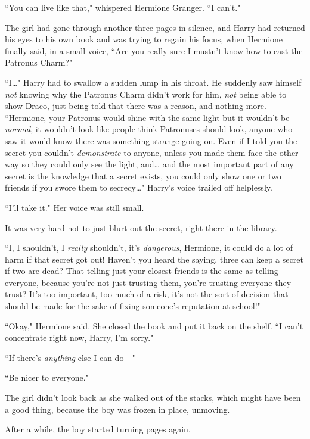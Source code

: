 ``You can live like that," whispered Hermione Granger. ``I can't."

The girl had gone through another three pages in silence, and Harry had returned his eyes to his own book and was trying to regain his focus, when Hermione finally said, in a small voice, ``Are you really sure I mustn't know how to cast the Patronus Charm?"

``I{\ldots}" Harry had to swallow a sudden lump in his throat. He suddenly saw himself \emph{not} knowing why the Patronus Charm didn't work for him, \emph{not} being able to show Draco, just being told that there was a reason, and nothing more. ``Hermione, your Patronus would shine with the same light but it wouldn't be \emph{normal}, it wouldn't look like people think Patronuses should look, anyone who saw it would know there was something strange going on. Even if I told you the secret you couldn't \emph{demonstrate} to anyone, unless you made them face the other way so they could only see the light, and{\ldots} and the most important part of any secret is the knowledge that a secret exists, you could only show one or two friends if you swore them to secrecy{\ldots}" Harry's voice trailed off helplessly.

``I'll take it." Her voice was still small.

It was very hard not to just blurt out the secret, right there in the library.

``I, I shouldn't, I \emph{really} shouldn't, it's \emph{dangerous}, Hermione, it could do a lot of harm if that secret got out! Haven't you heard the saying, three can keep a secret if two are dead? That telling just your closest friends is the same as telling everyone, because you're not just trusting them, you're trusting everyone they trust? It's too important, too much of a risk, it's not the sort of decision that should be made for the sake of fixing someone's reputation at school!"

``Okay," Hermione said. She closed the book and put it back on the shelf. ``I can't concentrate right now, Harry, I'm sorry."

``If there's \emph{anything} else I can do---"

``Be nicer to everyone."

The girl didn't look back as she walked out of the stacks, which might have been a good thing, because the boy was frozen in place, unmoving.

After a while, the boy started turning pages again.

